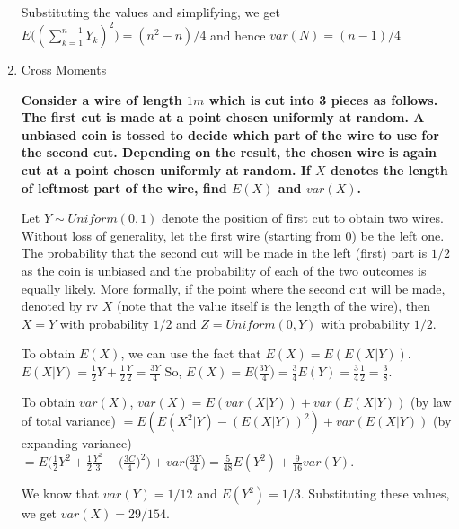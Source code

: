 \documentclass[12pt, oneside]{article}
\begin{document}
\begin{enumerate}
Substituting the values and simplifying, we get $E\big((\sum_{k=1}^{n-1} Y_k)^2\big) = (n^2-n)/4 $ and hence $var(N) = (n-1)/4$





\item Cross Moments

\noindent\textbf{ Consider a wire of length $1m$ which is cut into 3 pieces as follows. The first cut is made at a point chosen uniformly at random. A unbiased coin is tossed to decide which part of the wire to use for the second cut. Depending on the result, the chosen wire is again cut at a point chosen uniformly at random. If $X$ denotes the length of leftmost part of the wire, find $E(X)$ and $var(X)$.
}

Let $Y \sim Uniform(0,1)$ denote the position of first cut to obtain two wires. Without loss of generality, let the first wire (starting from 0) be the left one. The probability that the second cut will be made in the left (first) part is $1/2$ as the coin is unbiased and the probability of each of the two outcomes is equally likely. More formally, if the point where the second cut will be made, denoted by rv $X$ (note that the value itself is the length of the wire), then $X=Y$ with probability $1/2$ and $Z=Uniform(0,Y)$ with probability $1/2$.

To obtain $E(X)$, we can use the fact that $E(X) = E(E(X|Y))$. 
$E(X|Y) = \frac 1 2 Y + \frac 1 2 \frac Y 2 = \frac {3Y}{4}$
So, $E(X) = E\big(\frac {3Y}{4}\big) = \frac {3}{4} E(Y) = \frac 3 4 \frac 1 2 = \frac 3 8$.

To obtain $var(X)$, $var(X) = E(var(X|Y)) + var(E(X|Y))$ (by law of total variance) $ = E(E(X^2|Y)-(E(X|Y))^2) + var(E(X|Y))$ (by expanding variance) $ = E\big( \frac 1 2 Y^2 + \frac 1 2 \frac{Y^2}{3} - \big(\frac{3C}{4})^2 \big) + var \big(\frac{3Y}{4}) = \frac{5}{48}E(Y^2)+\frac{9}{16}var(Y)$. 

We know that $var(Y) = 1/12$ and $E(Y^2) = 1/3$. Substituting these values, we get $var(X) = 29/154$.












\end{enumerate}
\end{document}
